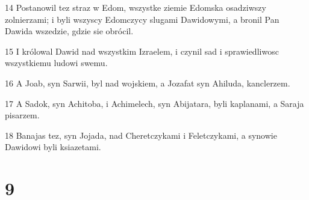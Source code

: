 \par 14 Postanowil tez straz w Edom, wszystke ziemie Edomska osadziwszy zolnierzami; i byli wszyscy Edomczycy slugami Dawidowymi, a bronil Pan Dawida wszedzie, gdzie sie obrócil.
\par 15 I królowal Dawid nad wszystkim Izraelem, i czynil sad i sprawiedliwosc wszystkiemu ludowi swemu.
\par 16 A Joab, syn Sarwii, byl nad wojskiem, a Jozafat syn Ahiluda, kanclerzem.
\par 17 A Sadok, syn Achitoba, i Achimelech, syn Abijatara, byli kaplanami, a Saraja pisarzem.
\par 18 Banajas tez, syn Jojada, nad Cheretczykami i Feletczykami, a synowie Dawidowi byli ksiazetami.

\chapter{9}


